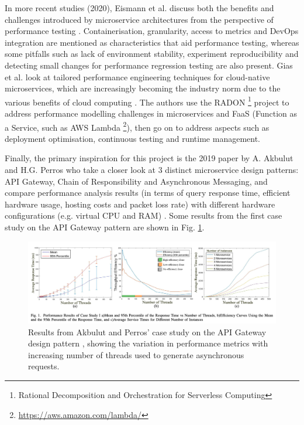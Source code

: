 In more recent studies (2020), Eismann et al. discuss both the benefits and challenges introduced by microservice architectures from the perspective of performance testing \cite{eismann20}. Containerisation, granularity, access to metrics and DevOps integration are mentioned as characteristics that aid performance testing, whereas some pitfalls such as lack of environment stability, experiment reproducibility and detecting small changes for performance regression testing are also present. Gias et al. look at tailored performance engineering techniques for cloud-native microservices, which are increasingly becoming the industry norm due to the various benefits of cloud computing \cite{gias20}. The authors use the RADON \footnote{Rational Decomposition and Orchestration for Serverless Computing} project to address performance modelling challenges in microservices and FaaS (Function as a Service, such as AWS Lambda \footnote{\url{https://aws.amazon.com/lambda/}}), then go on to address aspects such as deployment optimisation, continuous testing and runtime management.

Finally, the primary inspiration for this project is the 2019 paper by A. Akbulut and H.G. Perros who take a closer look at 3 distinct microservice design patterns: API Gateway, Chain of Responsibility and Asynchronous Messaging, and compare performance analysis results (in terms of query response time, efficient hardware usage, hosting costs and packet loss rate) with different hardware configurations (e.g. virtual CPU and RAM) \cite{akbulut19}. Some results from the first case study on the API Gateway pattern are shown in Fig. \ref{fig:akbulut19-results}.

\begin{figure}[H]
  \centering
  \includegraphics[width=1.0\linewidth]{./assets/images/related-work/akbulut19-results}
  \caption{Results from Akbulut and Perros' case study on the API Gateway design pattern \cite{akbulut19}, showing the variation in performance metrics with increasing number of threads used to generate asynchronous requests.}
  \label{fig:akbulut19-results}
\end{figure}


